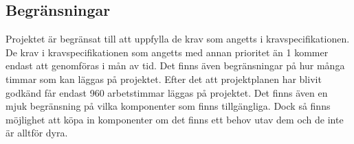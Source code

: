 \subsection{Begränsningar}

Projektet är begränsat till att uppfylla de krav som angetts i kravspecifikationen. De krav i kravspecifikationen som angetts med annan prioritet än 1 kommer endast att genomföras i mån av tid. Det finns även begränsningar på hur många timmar som kan läggas på projektet. Efter det att projektplanen har blivit godkänd får endast 960 arbetstimmar läggas på projektet. Det finns även en mjuk begränsning på vilka komponenter som finns tillgängliga. Dock så finns möjlighet att köpa in komponenter om det finns ett behov utav dem och de inte är alltför dyra.

